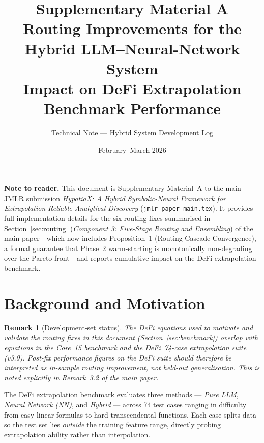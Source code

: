\documentclass[11pt,a4paper]{article}
\newtheorem{remark}{Remark}
\begin{document}
\title{%
  \textbf{Supplementary Material A}\\[6pt]
  \textbf{Routing Improvements for the Hybrid LLM--Neural-Network System}\\[4pt]
  \large Impact on DeFi Extrapolation Benchmark Performance
}
\author{Technical Note --- Hybrid System Development Log}
\date{February--March 2026}
\maketitle
\tableofcontents
\bigskip

\noindent\textbf{Note to reader.}  This document is Supplementary Material~A to
the main JMLR submission \emph{HypatiaX: A Hybrid Symbolic-Neural Framework for
Extrapolation-Reliable Analytical Discovery} (\texttt{jmlr\_paper\_main.tex}).
It provides full implementation details for the six routing fixes summarised in Section~\ref{sec:routing} (\emph{Component 3: Five-Stage Routing and Ensembling}) of the main paper---which now includes Proposition~1 (Routing Cascade Convergence), a formal guarantee that Phase~2 warm-starting is monotonically non-degrading over the Pareto front---and reports cumulative impact on the DeFi
extrapolation benchmark.

\section{Background and Motivation}
\label{sec:background}

\begin{remark}[Development-set status]
The DeFi equations used to motivate and validate the routing fixes in this
document (Section~\ref{sec:benchmark}) overlap with equations in the Core~15
benchmark and the DeFi~74-case extrapolation suite (v3.0).  Post-fix performance
figures on the DeFi suite should therefore be interpreted as
\emph{in-sample routing improvement}, not held-out generalisation.
This is noted explicitly in Remark~3.2 of the main paper.
\end{remark}

The DeFi extrapolation benchmark evaluates three methods --- \emph{Pure LLM},
\emph{Neural Network (NN)}, and \emph{Hybrid} --- across 74 test cases ranging
in difficulty from easy linear formulas to hard transcendental functions.
Each case splits data so the test set lies \emph{outside} the training feature
range, directly probing extrapolation ability rather than interpolation.
\end{document}
